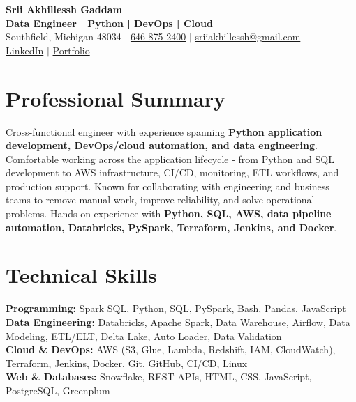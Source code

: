 \documentclass[letterpaper,10pt]{article}
\begin{document}
\fontsize{9.35pt}{10.45pt}\selectfont

\begin{center}
    {\LARGE \textbf{Srii Akhillessh Gaddam}} \\[-1pt]
    \textbf{Data Engineer | Python | DevOps | Cloud} \\[2pt]
    Southfield, Michigan 48034 $|$
    \href{tel:6468752400}{646-875-2400} $|$
    \href{mailto:sriiakhillessh@gmail.com}{sriiakhillessh@gmail.com} \\[1pt]
    \href{https://www.linkedin.com/in/srii-akhiilessh-gaddam-b48668191/}{LinkedIn} $|$
    \href{https://sriiakhillesshg.github.io/portfolio/}{Portfolio}
\end{center}
\vspace{-8pt}

\section{Professional Summary}
\small{Cross-functional engineer with experience spanning \textbf{Python application development, DevOps/cloud automation, and data engineering}. Comfortable working across the application lifecycle - from Python and SQL development to AWS infrastructure, CI/CD, monitoring, ETL workflows, and production support. Known for collaborating with engineering and business teams to remove manual work, improve reliability, and solve operational problems. Hands-on experience with \textbf{Python, SQL, AWS, data pipeline automation, Databricks, PySpark, Terraform, Jenkins, and Docker}.}

\section{Technical Skills}
\small{
\textbf{Programming:} Spark SQL, Python, SQL, PySpark, Bash, Pandas, JavaScript \\
\textbf{Data Engineering:} Databricks, Apache Spark, Data Warehouse, Airflow, Data Modeling, ETL/ELT, Delta Lake, Auto Loader, Data Validation \\
\textbf{Cloud \& DevOps:} AWS (S3, Glue, Lambda, Redshift, IAM, CloudWatch), Terraform, Jenkins, Docker, Git, GitHub, CI/CD, Linux \\
\textbf{Web \& Databases:} Snowflake, REST APIs, HTML, CSS, JavaScript, PostgreSQL, Greenplum
}
\end{document}
